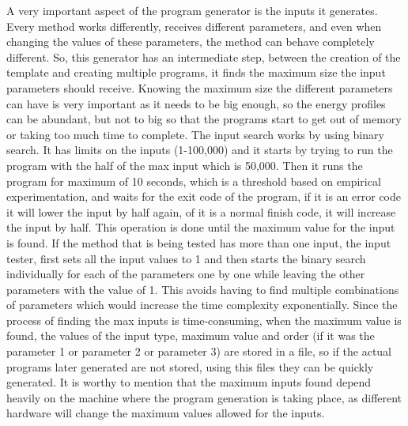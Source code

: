 A very important aspect of the program generator is the inputs it generates. Every method works differently, receives different parameters, and even when changing the values of these parameters, the method can behave completely different. So, this generator has an intermediate step, between the creation of the template and creating multiple programs, it finds the maximum size the input parameters should receive. Knowing the maximum size the different parameters can have is very important as it needs to be big enough, so the energy profiles can be abundant, but not to big so that the programs start to get out of memory or taking too much time to complete.
The input search works by using binary search. It has limits on the inputs (1-100,000) and it starts by trying to run the program with the half of the max input which is 50,000. Then it runs the program for maximum of 10 seconds, which is a threshold based on empirical experimentation, and waits for the exit code of the program, if it is an error code it will lower the input by half again, of it is a normal finish code, it will increase the input by half. This operation is done until the maximum value for the input is found. If the method that is being tested has more than one input, the input tester, first sets all the input values to 1 and then starts the binary search individually for each of the parameters one by one while leaving the other parameters with the value of 1. This avoids having to find multiple combinations of parameters which would increase the time complexity exponentially. Since the process of finding the max inputs is time-consuming, when the maximum value is found, the values of the input type, maximum value and order (if it was the parameter 1 or parameter 2 or parameter 3) are stored in a file, so if the actual programs later generated are not stored, using this files they can be quickly generated. It is worthy to mention that the maximum inputs found depend heavily on the machine where the program generation is taking place, as different hardware will change the maximum values allowed for the inputs.

